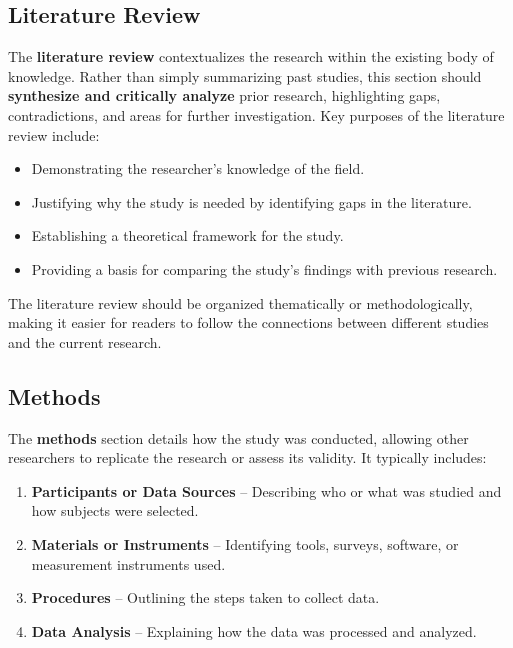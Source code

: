 \documentclass[
]{book}
\providecommand{\tightlist}{%
  \setlength{\itemsep}{0pt}\setlength{\parskip}{0pt}}
\begin{document}
\subsection*{Literature Review}\label{literature-review}

The \textbf{literature review} contextualizes the research within the existing body of knowledge. Rather than simply summarizing past studies, this section should \textbf{synthesize and critically analyze} prior research, highlighting gaps, contradictions, and areas for further investigation. Key purposes of the literature review include:

\begin{itemize}
\tightlist
\item
  Demonstrating the researcher's knowledge of the field.
\item
  Justifying why the study is needed by identifying gaps in the literature.
\item
  Establishing a theoretical framework for the study.
\item
  Providing a basis for comparing the study's findings with previous research.
\end{itemize}

The literature review should be organized thematically or methodologically, making it easier for readers to follow the connections between different studies and the current research.

\subsection*{Methods}\label{methods}

The \textbf{methods} section details how the study was conducted, allowing other researchers to replicate the research or assess its validity. It typically includes:

\begin{enumerate}
\def\labelenumi{\arabic{enumi}.}
\tightlist
\item
  \textbf{Participants or Data Sources} -- Describing who or what was studied and how subjects were selected.
\item
  \textbf{Materials or Instruments} -- Identifying tools, surveys, software, or measurement instruments used.
\item
  \textbf{Procedures} -- Outlining the steps taken to collect data.
\item
  \textbf{Data Analysis} -- Explaining how the data was processed and analyzed.
\end{enumerate}
\end{document}
